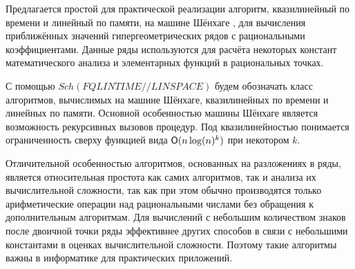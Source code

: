 

\date{01/II/2011} %


\maketitle


Предлагается простой для практической реализации
алгоритм, квазилинейный по времени и линейный по памяти, на машине
Шёнхаге \cite{yakhontov:bib:Schonhage}, для вычисления приближённых
значений гипергеометрических рядов с рациональными коэффициентами.
Данные ряды используются для расчёта некоторых констант математического
анализа и элементарных функций в рациональных точках. 

С помощью $Sch(FQLINTIME//LINSPACE)$ будем обозначать класс алгоритмов,
вычислимых на машине Шёнхаге, квазилинейных по времени и линейных по памяти.
Основной особенностью машины Шёнхаге является возможность рекурсивных
вызовов процедур. Под квазилинейностью понимается ограниченность сверху
функцией вида ${\sf O}(n\log(n)^k)$ при некотором $k$.

Отличительной особенностью алгоритмов, основанных на разложениях в ряды,
является относительная простота как самих алгоритмов, так и анализа
их вычислительной сложности, так как при этом обычно производятся только
арифметические операции над рациональными числами без обращения к
дополнительным алгоритмам.
Для вычислений с небольшим количеством знаков после двоичной точки
ряды эффективнее других способов в связи с небольшими константами в
оценках вычислительной сложности. Поэтому такие алгоритмы важны в информатике
для практических приложений.

